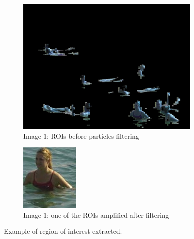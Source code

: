 \begin{figure}[H]
        \centering
        \begin{subfigure}[h]{0.3\textwidth}
                \includegraphics[width=\textwidth]{Images/proc}
                \caption{Image 1: ROIs before particles filtering}
        \end{subfigure}%
        \quad
        \begin{subfigure}[h]{0.3\textwidth}
                \includegraphics[width=\textwidth]{Images/ROI}
                \caption{Image 1: one of the ROIs amplified after filtering}
        \end{subfigure}
        \caption{Example of region of interest extracted.}
         \label{fig:ROIs}
\end{figure}



